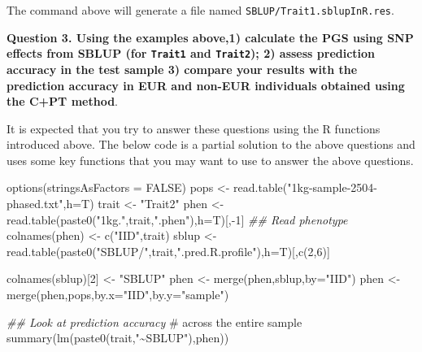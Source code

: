 \documentclass[
  letterpaper,
  DIV=11,
  numbers=noendperiod]{scrartcl}
\newenvironment{Shaded}{\begin{snugshade}}{\end{snugshade}}
\newcommand{\AttributeTok}[1]{\textcolor[rgb]{0.40,0.45,0.13}{#1}}
\newcommand{\CommentTok}[1]{\textcolor[rgb]{0.37,0.37,0.37}{#1}}
\newcommand{\ConstantTok}[1]{\textcolor[rgb]{0.56,0.35,0.01}{#1}}
\newcommand{\DecValTok}[1]{\textcolor[rgb]{0.68,0.00,0.00}{#1}}
\newcommand{\DocumentationTok}[1]{\textcolor[rgb]{0.37,0.37,0.37}{\textit{#1}}}
\newcommand{\FunctionTok}[1]{\textcolor[rgb]{0.28,0.35,0.67}{#1}}
\newcommand{\NormalTok}[1]{\textcolor[rgb]{0.00,0.23,0.31}{#1}}
\newcommand{\OtherTok}[1]{\textcolor[rgb]{0.00,0.23,0.31}{#1}}
\newcommand{\SpecialCharTok}[1]{\textcolor[rgb]{0.37,0.37,0.37}{#1}}
\newcommand{\StringTok}[1]{\textcolor[rgb]{0.13,0.47,0.30}{#1}}
\begin{document}
The command above will generate a file named
\texttt{SBLUP/Trait1.sblupInR.res}.

\textbf{Question 3. Using the examples above,1) calculate the PGS using
SNP effects from SBLUP (for \texttt{Trait1} and \texttt{Trait2}); 2)
assess prediction accuracy in the test sample 3) compare your results
with the prediction accuracy in EUR and non-EUR individuals obtained
using the C+PT method}.

It is expected that you try to answer these questions using the R
functions introduced above. The below code is a partial solution to the
above questions and uses some key functions that you may want to use to
answer the above questions.

\begin{Shaded}
\begin{Highlighting}[]
\FunctionTok{options}\NormalTok{(}\AttributeTok{stringsAsFactors =} \ConstantTok{FALSE}\NormalTok{)}
\NormalTok{pops   }\OtherTok{\textless{}{-}} \FunctionTok{read.table}\NormalTok{(}\StringTok{"1kg{-}sample{-}2504{-}phased.txt"}\NormalTok{,}\AttributeTok{h=}\NormalTok{T)}
\NormalTok{trait  }\OtherTok{\textless{}{-}} \StringTok{"Trait2"}
\NormalTok{phen   }\OtherTok{\textless{}{-}} \FunctionTok{read.table}\NormalTok{(}\FunctionTok{paste0}\NormalTok{(}\StringTok{"1kg."}\NormalTok{,trait,}\StringTok{".phen"}\NormalTok{),}\AttributeTok{h=}\NormalTok{T)[,}\SpecialCharTok{{-}}\DecValTok{1}\NormalTok{] }\DocumentationTok{\#\# Read phenotype}
\FunctionTok{colnames}\NormalTok{(phen) }\OtherTok{\textless{}{-}} \FunctionTok{c}\NormalTok{(}\StringTok{"IID"}\NormalTok{,trait)}
\NormalTok{sblup  }\OtherTok{\textless{}{-}} \FunctionTok{read.table}\NormalTok{(}\FunctionTok{paste0}\NormalTok{(}\StringTok{"SBLUP/"}\NormalTok{,trait,}\StringTok{".pred.R.profile"}\NormalTok{),}\AttributeTok{h=}\NormalTok{T)[,}\FunctionTok{c}\NormalTok{(}\DecValTok{2}\NormalTok{,}\DecValTok{6}\NormalTok{)]}

\FunctionTok{colnames}\NormalTok{(sblup)[}\DecValTok{2}\NormalTok{] }\OtherTok{\textless{}{-}} \StringTok{"SBLUP"}
\NormalTok{phen }\OtherTok{\textless{}{-}} \FunctionTok{merge}\NormalTok{(phen,sblup,}\AttributeTok{by=}\StringTok{"IID"}\NormalTok{)}
\NormalTok{phen }\OtherTok{\textless{}{-}} \FunctionTok{merge}\NormalTok{(phen,pops,}\AttributeTok{by.x=}\StringTok{"IID"}\NormalTok{,}\AttributeTok{by.y=}\StringTok{"sample"}\NormalTok{)}

\DocumentationTok{\#\# Look at prediction accuracy}
\CommentTok{\# across the entire sample}
\FunctionTok{summary}\NormalTok{(}\FunctionTok{lm}\NormalTok{(}\FunctionTok{paste0}\NormalTok{(trait,}\StringTok{"\textasciitilde{}SBLUP"}\NormalTok{),phen)) }


\end{Highlighting}
\end{Shaded}
\end{document}
